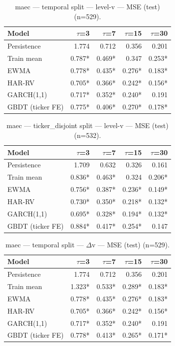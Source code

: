 \begin{table}[t]
\centering
\begin{tabular}{lrrrr}
\toprule
Model & $\tau$=3 & $\tau$=7 & $\tau$=15 & $\tau$=30 \\
\midrule
Persistence & 1.774 & 0.712 & 0.356 & 0.201 \\
Train mean & 0.787* & 0.469* & 0.347 & 0.253* \\
EWMA & 0.778* & 0.435* & 0.276* & 0.183* \\
HAR-RV & 0.705* & 0.366* & 0.242* & 0.156* \\
GARCH(1,1) & 0.717* & 0.352* & 0.240* & 0.191 \\
GBDT (ticker FE) & 0.775* & 0.406* & 0.270* & 0.178* \\
\bottomrule
\end{tabular}
\caption{maec — temporal split — level-v — MSE (test) (n=529).}
\end{table}

\begin{table}[t]
\centering
\begin{tabular}{lrrrr}
\toprule
Model & $\tau$=3 & $\tau$=7 & $\tau$=15 & $\tau$=30 \\
\midrule
Persistence & 1.709 & 0.632 & 0.326 & 0.161 \\
Train mean & 0.836* & 0.463* & 0.324 & 0.206* \\
EWMA & 0.756* & 0.387* & 0.236* & 0.149* \\
HAR-RV & 0.730* & 0.350* & 0.218* & 0.132* \\
GARCH(1,1) & 0.695* & 0.328* & 0.194* & 0.132* \\
GBDT (ticker FE) & 0.884* & 0.417* & 0.254* & 0.147 \\
\bottomrule
\end{tabular}
\caption{maec — ticker\_disjoint split — level-v — MSE (test) (n=532).}
\end{table}

\begin{table}[t]
\centering
\begin{tabular}{lrrrr}
\toprule
Model & $\tau$=3 & $\tau$=7 & $\tau$=15 & $\tau$=30 \\
\midrule
Persistence & 1.774 & 0.712 & 0.356 & 0.201 \\
Train mean & 1.323* & 0.533* & 0.289* & 0.183* \\
EWMA & 0.778* & 0.435* & 0.276* & 0.183* \\
HAR-RV & 0.705* & 0.366* & 0.242* & 0.156* \\
GARCH(1,1) & 0.717* & 0.352* & 0.240* & 0.191 \\
GBDT (ticker FE) & 0.778* & 0.413* & 0.265* & 0.171* \\
\bottomrule
\end{tabular}
\caption{maec — temporal split — $\Delta$v — MSE (test) (n=529).}
\end{table}


